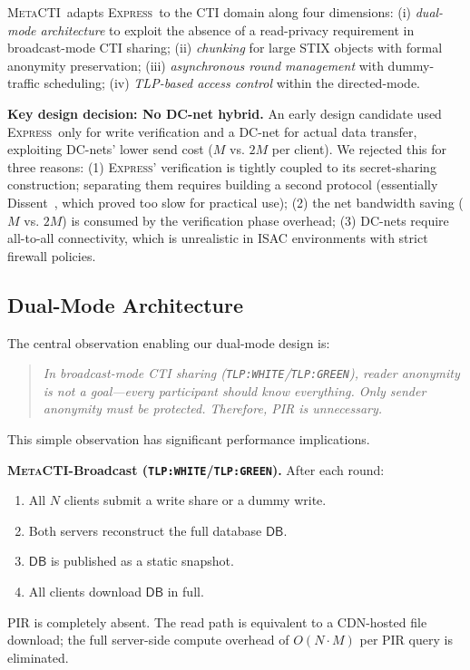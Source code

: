 \documentclass[letterpaper,twocolumn,10pt]{article}
\newcommand{\metacti}{\textsc{MetaCTI}}
\newcommand{\express}{\textsc{Express}}
\newcommand{\tlp}[1]{\texttt{TLP:#1}}
\begin{document}
\metacti\ adapts \express\ to the CTI domain along four dimensions:
(i) \emph{dual-mode architecture} to exploit the absence of a read-privacy
requirement in broadcast-mode CTI sharing;
(ii) \emph{chunking} for large STIX objects with formal anonymity
preservation;
(iii) \emph{asynchronous round management} with dummy-traffic scheduling;
(iv) \emph{TLP-based access control} within the directed-mode.

\textbf{Key design decision: No DC-net hybrid.}
\label{sec:design_decisions}
An early design candidate used \express\ only for write verification
and a DC-net for actual data transfer, exploiting DC-nets' lower send
cost ($M$ vs. $2M$ per client).
We rejected this for three reasons:
(1) \express' verification is tightly coupled to its secret-sharing
construction; separating them requires building a second protocol
(essentially Dissent~\cite{corrigan2010dissent}, which proved too slow
for practical use);
(2) the net bandwidth saving ($M$ vs. $2M$) is consumed by the
verification phase overhead;
(3) DC-nets require all-to-all connectivity, which is unrealistic in
ISAC environments with strict firewall policies.

\subsection{Dual-Mode Architecture}
\label{sec:dual_mode}

The central observation enabling our dual-mode design is:

\begin{quotation}
  \noindent\emph{In broadcast-mode CTI sharing (\tlp{WHITE}/\tlp{GREEN}),
  reader anonymity is not a goal—every participant should know
  everything. Only sender anonymity must be protected.
  Therefore, PIR is unnecessary.}
\end{quotation}

This simple observation has significant performance implications.

\textbf{\metacti-Broadcast (\tlp{WHITE}/\tlp{GREEN}).}
After each round:
\begin{enumerate}[nosep]
  \item All $N$ clients submit a write share or a dummy write.
  \item Both servers reconstruct the full database $\mathsf{DB}$.
  \item $\mathsf{DB}$ is published as a static snapshot.
  \item All clients download $\mathsf{DB}$ in full.
\end{enumerate}
PIR is completely absent. The read path is equivalent to a CDN-hosted
file download; the full server-side compute overhead of $O(N \cdot M)$
per PIR query is eliminated.
\end{document}
